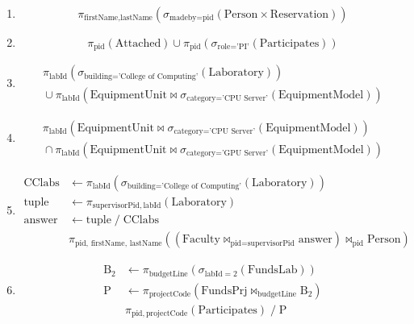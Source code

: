 \documentclass[11pt,a4paper]{article}
\begin{document}
\begin{enumerate}
    \item[\textbf{1.}] 
    \[
    \pi_{\text{firstName}, \text{lastName}}\left(\sigma_{\text{madeby}=\text{pid}}(\text{Person} \times \text{Reservation})\right)
    \]

    \item[\textbf{2.}] 
    \[
    \pi_{\text{pid}}(\text{Attached}) \cup \pi_{\text{pid}}\left(\sigma_{\text{role}=\text{'PI'}}(\text{Participates})\right)
    \]

    \item[\textbf{3.}] 
    \[
    \begin{multlined}
    \pi_{\text{labId}}\left(\sigma_{\text{building}=\text{'College of Computing'}}(\text{Laboratory})\right) \\
    {}\cup \pi_{\text{labId}}\left(\text{EquipmentUnit} \bowtie \sigma_{\text{category}=\text{'CPU Server'}}(\text{EquipmentModel})\right)
    \end{multlined}
    \]

    \item[\textbf{4.}] 
    \[
    \begin{multlined}
    \pi_{\text{labId}}\left(\text{EquipmentUnit} \bowtie \sigma_{\text{category}=\text{'CPU Server'}}(\text{EquipmentModel})\right) \\
    {}\cap \pi_{\text{labId}}\left(\text{EquipmentUnit} \bowtie \sigma_{\text{category}=\text{'GPU Server'}}(\text{EquipmentModel})\right)
    \end{multlined}
    \]

    \item[\textbf{5.}]
    \[
    \begin{aligned}
    \text{CClabs} &\leftarrow \pi_{\text{labId}} \left( \sigma_{\text{building}=\text{'College of Computing'}} (\text{Laboratory}) \right) \\
    \text{tuple} &\leftarrow \pi_{\text{supervisorPid},\,\text{labId}} (\text{Laboratory}) \\
    \text{answer} &\leftarrow \text{tuple}\;/\;\text{CClabs} \\
    &\pi_{\text{pid},\,\text{firstName},\,\text{lastName}} \left( \left( \text{Faculty} \bowtie_{\text{pid}=\text{supervisorPid}} \text{answer} \right) \bowtie_{\text{pid}} \text{Person} \right)
    \end{aligned}
    \]

    \item[\textbf{6.}]
    \[
    \begin{aligned}
    \text{B}_2 &\leftarrow \pi_{\text{budgetLine}} \left( \sigma_{\text{labId}=2} (\text{FundsLab}) \right) \\
    \text{P} &\leftarrow \pi_{\text{projectCode}} \left( \text{FundsPrj} \bowtie_{\text{budgetLine}} \text{B}_2 \right) \\
    &\pi_{\text{pid},\,\text{projectCode}} (\text{Participates})\;/\;\text{P}
    \end{aligned}
    \]


\end{enumerate}
\end{document}
